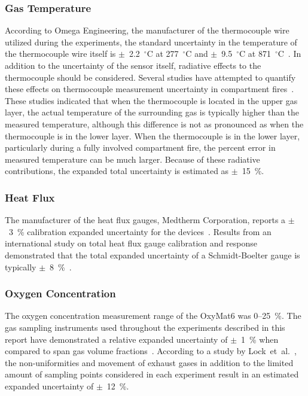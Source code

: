 \documentclass[12pt,oneside]{book}
\begin{document}
\subsubsection*{Gas Temperature}
According to Omega Engineering, the manufacturer of the thermocouple wire utilized during the experiments, the standard uncertainty in the temperature of the thermocouple wire itself is $\pm$~2.2~$^\circ$C at 277~$^\circ$C and $\pm$~9.5~$^\circ$C at 871~$^\circ$C~\cite{Omega:2004}. In addition to the uncertainty of the sensor itself, radiative effects to the thermocouple should be considered. Several studies have attempted to quantify these effects on thermocouple measurement uncertainty in compartment fires~\cite{Blevins:1999,Pitts:2003}. These studies indicated that when the thermocouple is located in the upper gas layer, the actual temperature of the surrounding gas is typically higher than the measured temperature, although this difference is not as pronounced as when the thermocouple is in the lower layer. When the thermocouple is in the lower layer, particularly during a fully involved compartment fire, the percent error in measured temperature can be much larger. Because of these radiative contributions, the expanded total uncertainty is estimated as $\pm$~15~\%.

\subsubsection*{Heat Flux}
The manufacturer of the heat flux gauges, Medtherm Corporation, reports a $\pm$~3~\% calibration expanded uncertainty for the devices~\cite{Medtherm:2003}. Results from an international study on total heat flux gauge calibration and response demonstrated that the total expanded uncertainty of a Schmidt-Boelter gauge is typically $\pm$~8~\%~\cite{Pitts:2006}.

\subsubsection*{Oxygen Concentration}
The oxygen concentration measurement range of the OxyMat6 was 0--25~\%. The gas sampling instruments used throughout the experiments described in this report have demonstrated a relative expanded uncertainty of $\pm$~1~\% when compared to span gas volume fractions~\cite{Bundy:2007}. According to a study by Lock~et~al.~\cite{Lock:1}, the non-uniformities and movement of exhaust gases in addition to the limited amount of sampling points considered in each experiment result in an estimated expanded uncertainty of $\pm$~12~\%.
\end{document}
